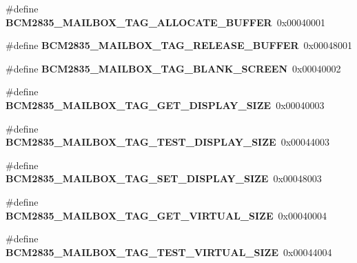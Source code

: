 \begin{DoxyCompactItemize}
\#define {\bfseries B\+C\+M2835\+\_\+\+M\+A\+I\+L\+B\+O\+X\+\_\+\+T\+A\+G\+\_\+\+A\+L\+L\+O\+C\+A\+T\+E\+\_\+\+B\+U\+F\+F\+ER}~0x00040001
\item 
\mbox{\label{group__raspberrypi__vc_ga2b49344f97bf3e70532a77849752e991}} 
\#define {\bfseries B\+C\+M2835\+\_\+\+M\+A\+I\+L\+B\+O\+X\+\_\+\+T\+A\+G\+\_\+\+R\+E\+L\+E\+A\+S\+E\+\_\+\+B\+U\+F\+F\+ER}~0x00048001
\item 
\mbox{\label{group__raspberrypi__vc_ga0de96840f236e4dec2402c67d476ad99}} 
\#define {\bfseries B\+C\+M2835\+\_\+\+M\+A\+I\+L\+B\+O\+X\+\_\+\+T\+A\+G\+\_\+\+B\+L\+A\+N\+K\+\_\+\+S\+C\+R\+E\+EN}~0x00040002
\item 
\mbox{\label{group__raspberrypi__vc_gafd11bea4c422de0170e57b32cc7c0720}} 
\#define {\bfseries B\+C\+M2835\+\_\+\+M\+A\+I\+L\+B\+O\+X\+\_\+\+T\+A\+G\+\_\+\+G\+E\+T\+\_\+\+D\+I\+S\+P\+L\+A\+Y\+\_\+\+S\+I\+ZE}~0x00040003
\item 
\mbox{\label{group__raspberrypi__vc_ga446983c9f0661a2dd04e1a490b1ffbae}} 
\#define {\bfseries B\+C\+M2835\+\_\+\+M\+A\+I\+L\+B\+O\+X\+\_\+\+T\+A\+G\+\_\+\+T\+E\+S\+T\+\_\+\+D\+I\+S\+P\+L\+A\+Y\+\_\+\+S\+I\+ZE}~0x00044003
\item 
\mbox{\label{group__raspberrypi__vc_gaad6c2c02ce73d29fe09f49482e3cae65}} 
\#define {\bfseries B\+C\+M2835\+\_\+\+M\+A\+I\+L\+B\+O\+X\+\_\+\+T\+A\+G\+\_\+\+S\+E\+T\+\_\+\+D\+I\+S\+P\+L\+A\+Y\+\_\+\+S\+I\+ZE}~0x00048003
\item 
\mbox{\label{group__raspberrypi__vc_gac978aea09baa0be05a8efd7158732975}} 
\#define {\bfseries B\+C\+M2835\+\_\+\+M\+A\+I\+L\+B\+O\+X\+\_\+\+T\+A\+G\+\_\+\+G\+E\+T\+\_\+\+V\+I\+R\+T\+U\+A\+L\+\_\+\+S\+I\+ZE}~0x00040004
\item 
\mbox{\label{group__raspberrypi__vc_gac3ff645962447568137af547df96dc4d}} 
\#define {\bfseries B\+C\+M2835\+\_\+\+M\+A\+I\+L\+B\+O\+X\+\_\+\+T\+A\+G\+\_\+\+T\+E\+S\+T\+\_\+\+V\+I\+R\+T\+U\+A\+L\+\_\+\+S\+I\+ZE}~0x00044004
\item 
\mbox{\label{group__raspberrypi__vc_ga142b3a2bd3bef4019d1112266d9bd8e8}} 

\end{DoxyCompactItemize}
